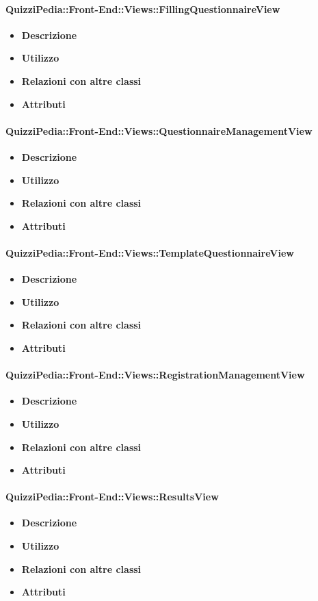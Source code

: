 \paragraph{QuizziPedia::Front-End::Views::FillingQuestionnaireView}
\begin{itemize}
	\item \textbf{Descrizione}
	\item \textbf{Utilizzo}
	\item \textbf{Relazioni con altre classi}
	\item \textbf{Attributi}
	\end{itemize}
\paragraph{QuizziPedia::Front-End::Views::QuestionnaireManagementView}
\begin{itemize}
	\item \textbf{Descrizione}
	\item \textbf{Utilizzo}
	\item \textbf{Relazioni con altre classi}
	\item \textbf{Attributi}
	\end{itemize}
\paragraph{QuizziPedia::Front-End::Views::TemplateQuestionnaireView}
\begin{itemize}
	\item \textbf{Descrizione}
	\item \textbf{Utilizzo}
	\item \textbf{Relazioni con altre classi}
	\item \textbf{Attributi}
	\end{itemize}
\paragraph{QuizziPedia::Front-End::Views::RegistrationManagementView}
\begin{itemize}
	\item \textbf{Descrizione}
	\item \textbf{Utilizzo}
	\item \textbf{Relazioni con altre classi}
	\item \textbf{Attributi}
	\end{itemize}
\paragraph{QuizziPedia::Front-End::Views::ResultsView}
\begin{itemize}
	\item \textbf{Descrizione}
	\item \textbf{Utilizzo}
	\item \textbf{Relazioni con altre classi}
	\item \textbf{Attributi}
	\end{itemize}
